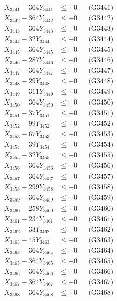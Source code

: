 \documentclass[a4paper,10pt]{article}
\begin{document}
{\begin{align}
\allowbreak
X_{3441} - 364Y_{3441} &\leq +0 && \text{(G3441)} \\
X_{3442} - 364Y_{3442} &\leq +0 && \text{(G3442)} \\
X_{3443} - 364Y_{3443} &\leq +0 && \text{(G3443)} \\
X_{3444} - 32Y_{3444} &\leq +0 && \text{(G3444)} \\
X_{3445} - 364Y_{3445} &\leq +0 && \text{(G3445)} \\
X_{3446} - 287Y_{3446} &\leq +0 && \text{(G3446)} \\
X_{3447} - 364Y_{3447} &\leq +0 && \text{(G3447)} \\
X_{3448} - 29Y_{3448} &\leq +0 && \text{(G3448)} \\
X_{3449} - 311Y_{3449} &\leq +0 && \text{(G3449)} \\
X_{3450} - 364Y_{3450} &\leq +0 && \text{(G3450)} \\
\allowbreak
X_{3451} - 37Y_{3451} &\leq +0 && \text{(G3451)} \\
X_{3452} - 99Y_{3452} &\leq +0 && \text{(G3452)} \\
X_{3453} - 67Y_{3453} &\leq +0 && \text{(G3453)} \\
X_{3454} - 39Y_{3454} &\leq +0 && \text{(G3454)} \\
X_{3455} - 32Y_{3455} &\leq +0 && \text{(G3455)} \\
X_{3456} - 364Y_{3456} &\leq +0 && \text{(G3456)} \\
X_{3457} - 364Y_{3457} &\leq +0 && \text{(G3457)} \\
X_{3458} - 299Y_{3458} &\leq +0 && \text{(G3458)} \\
X_{3459} - 364Y_{3459} &\leq +0 && \text{(G3459)} \\
X_{3460} - 258Y_{3460} &\leq +0 && \text{(G3460)} \\
\allowbreak
X_{3461} - 234Y_{3461} &\leq +0 && \text{(G3461)} \\
X_{3462} - 33Y_{3462} &\leq +0 && \text{(G3462)} \\
X_{3463} - 45Y_{3463} &\leq +0 && \text{(G3463)} \\
X_{3464} - 364Y_{3464} &\leq +0 && \text{(G3464)} \\
X_{3465} - 364Y_{3465} &\leq +0 && \text{(G3465)} \\
X_{3466} - 364Y_{3466} &\leq +0 && \text{(G3466)} \\
X_{3467} - 364Y_{3467} &\leq +0 && \text{(G3467)} \\
X_{3468} - 364Y_{3468} &\leq +0 && \text{(G3468)} \\

\end{align}}
\end{document}
